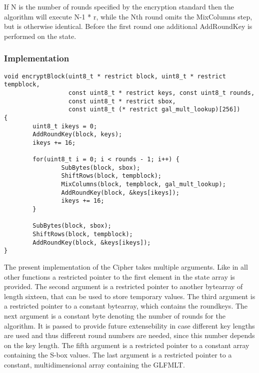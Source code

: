 If N is the number of rounds specified by the encryption standard then
the algorithm will execute N-1 * r, while the Nth round omits the
MixColumns step, but is otherwise identical. Before the first round one
additional AddRoundKey is performed on the state.

\hypertarget{implementation-5}{%
\subsubsection{Implementation}\label{implementation-5}}

\begin{lstlisting}
void encryptBlock(uint8_t * restrict block, uint8_t * restrict tempblock, 
                  const uint8_t * restrict keys, const uint8_t rounds, 
                  const uint8_t * restrict sbox, 
                  const uint8_t (* restrict gal_mult_lookup)[256])
{   
        uint8_t ikeys = 0;
        AddRoundKey(block, keys);
        ikeys += 16;

        for(uint8_t i = 0; i < rounds - 1; i++) {   
                SubBytes(block, sbox);
                ShiftRows(block, tempblock);
                MixColumns(block, tempblock, gal_mult_lookup);
                AddRoundKey(block, &keys[ikeys]);
                ikeys += 16;
        }
        
        SubBytes(block, sbox);
        ShiftRows(block, tempblock);
        AddRoundKey(block, &keys[ikeys]);
}
\end{lstlisting}

The present implementation of the Cipher takes multiple arguments. Like
in all other functions a restricted pointer to the first element in the
state array is provided. The second argument is a restricted pointer to
another bytearray of length sixteen, that can be used to store temporary
values. The third argument is a restricted pointer to a constant
bytearray, which contains the roundkeys. The next argument is a constant
byte denoting the number of rounds for the algorithm. It is passed to
provide future extensebility in case different key lengths are used and
thus different round numbers are needed, since this number depends on
the key length. The fifth argument is a restricted pointer to a constant
array containing the S-box values. The last argument is a restricted
pointer to a constant, multidimensional array containing the GLFMLT.

